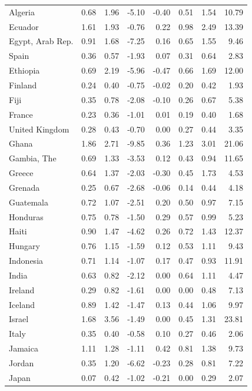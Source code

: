 \begin{longtable}{lrrrrrrr}
Algeria & 0.68 & 1.96 & -5.10 & -0.40 & 0.51 & 1.54 & 10.79 \\
Ecuador & 1.61 & 1.93 & -0.76 & 0.22 & 0.98 & 2.49 & 13.39 \\
Egypt, Arab Rep. & 0.91 & 1.68 & -7.25 & 0.16 & 0.65 & 1.55 & 9.46 \\
Spain & 0.36 & 0.57 & -1.93 & 0.07 & 0.31 & 0.64 & 2.83 \\
Ethiopia & 0.69 & 2.19 & -5.96 & -0.47 & 0.66 & 1.69 & 12.00 \\
Finland & 0.24 & 0.40 & -0.75 & -0.02 & 0.20 & 0.42 & 1.93 \\
Fiji & 0.35 & 0.78 & -2.08 & -0.10 & 0.26 & 0.67 & 5.38 \\
France & 0.23 & 0.36 & -1.01 & 0.01 & 0.19 & 0.40 & 1.68 \\
United Kingdom & 0.28 & 0.43 & -0.70 & 0.00 & 0.27 & 0.44 & 3.35 \\
Ghana & 1.86 & 2.71 & -9.85 & 0.36 & 1.23 & 3.01 & 21.06 \\
Gambia, The & 0.69 & 1.33 & -3.53 & 0.12 & 0.43 & 0.94 & 11.65 \\
Greece & 0.64 & 1.37 & -2.03 & -0.30 & 0.45 & 1.73 & 4.53 \\
Grenada & 0.25 & 0.67 & -2.68 & -0.06 & 0.14 & 0.44 & 4.18 \\
Guatemala & 0.72 & 1.07 & -2.51 & 0.20 & 0.50 & 0.97 & 7.15 \\
Honduras & 0.75 & 0.78 & -1.50 & 0.29 & 0.57 & 0.99 & 5.23 \\
Haiti & 0.90 & 1.47 & -4.62 & 0.26 & 0.72 & 1.43 & 12.37 \\
Hungary & 0.76 & 1.15 & -1.59 & 0.12 & 0.53 & 1.11 & 9.43 \\
Indonesia & 0.71 & 1.14 & -1.07 & 0.17 & 0.47 & 0.93 & 11.91 \\
India & 0.63 & 0.82 & -2.12 & 0.00 & 0.64 & 1.11 & 4.47 \\
Ireland & 0.29 & 0.82 & -1.61 & 0.00 & 0.00 & 0.48 & 7.13 \\
Iceland & 0.89 & 1.42 & -1.47 & 0.13 & 0.44 & 1.06 & 9.97 \\
Israel & 1.68 & 3.56 & -1.49 & 0.00 & 0.45 & 1.31 & 23.81 \\
Italy & 0.35 & 0.40 & -0.58 & 0.10 & 0.27 & 0.46 & 2.06 \\
Jamaica & 1.11 & 1.28 & -1.11 & 0.42 & 0.81 & 1.38 & 9.73 \\
Jordan & 0.35 & 1.20 & -6.62 & -0.23 & 0.28 & 0.81 & 7.22 \\
Japan & 0.07 & 0.42 & -1.02 & -0.21 & 0.00 & 0.29 & 2.07 \\

\end{longtable}
